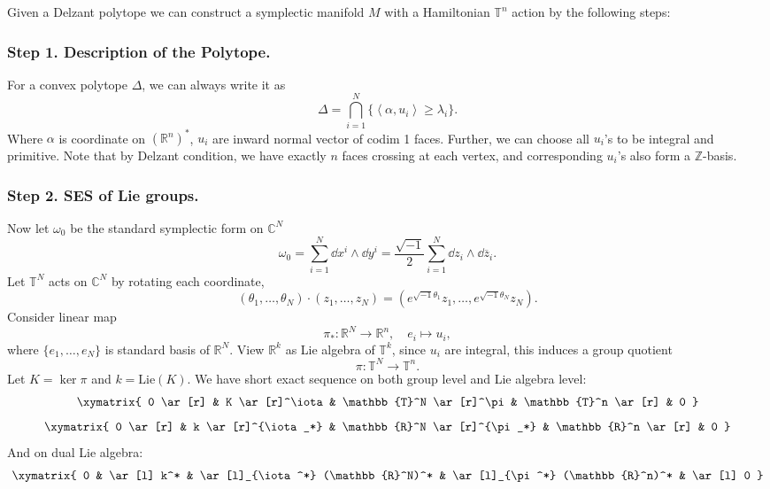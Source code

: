 \documentclass[12pt]{article}
\theoremstyle{plain}\newtheorem{theorem}{Theorem}
\theoremstyle{definition}\newtheorem{definition}[theorem]{Definition}
\theoremstyle{definition}\newtheorem{example}[theorem]{Example}
\theoremstyle{plain}\newtheorem{axiom}[theorem]{Axiom}
\theoremstyle{plain}\newtheorem{assertion}[theorem]{Assertion}
\theoremstyle{plain}\newtheorem{corollary}[theorem]{Corollary}
\theoremstyle{plain}\newtheorem{lemma}[theorem]{Lemma}
\theoremstyle{plain}\newtheorem{proposition}[theorem]{Proposition}
\theoremstyle{plain}\newtheorem{prop}[theorem]{Proposition}
\theoremstyle{plain}\newtheorem{conjecture}[theorem]{Conjecture}
\theoremstyle{plain}\newtheorem{conj}[theorem]{Conjecture}
\theoremstyle{plain}\newtheorem{problem}[theorem]{Problem}
\theoremstyle{remark}\newtheorem{notation}[theorem]{Notation}
\theoremstyle{definition}\newtheorem*{question}{Question}
\theoremstyle{definition}\newtheorem*{answer}{Answer}
\theoremstyle{definition}\newtheorem*{goal}{Goal}
\theoremstyle{plain}\newtheorem*{application}{Application}
\theoremstyle{plain}\newtheorem*{exercise}{Exercise}
\theoremstyle{remark}\newtheorem*{remark}{Remark}
\theoremstyle{remark}\newtheorem*{note}{\small{Note}}
\numberwithin{equation}{section}
\numberwithin{theorem}{section}
\numberwithin{figure}{section}
\begin{document}
Given a Delzant polytope we can construct a symplectic manifold \(M\) with a
Hamiltonian \(\mathbb{T}^n\) action by the following steps:

\subsubsection*{Step 1. Description of the Polytope.}
For a convex polytope \(\Delta\), we can always write it as \[
    \Delta=\bigcap_{i=1}^N \{\left<\alpha,u_i\right> \ge \lambda_i\}
.\] Where \(\alpha\) is coordinate on \((\mathbb{R}^n)^*\), \(u_i\) are inward
normal vector of codim 1 faces. Further, we can choose all \(u_i\)'s to be integral and
primitive. Note that by Delzant condition, we have exactly \(n\) faces crossing
at each vertex, and corresponding \(u_i\)'s also form a \(\mathbb{Z}\)-basis.

\subsubsection*{Step 2. SES of Lie groups.}
Now let \(\omega_0\) be the standard symplectic form on \(\mathbb{C}^N\) \[
    \omega_0=\sum_{i=1}^N \dd{x^i}\wedge \dd{y^i}=\frac{\sqrt{-1}}{2}
    \sum_{i=1}^N\dd{z_i}\wedge \dd{\overline{z}_i}
.\] Let \(\mathbb{T}^N\) acts on \(\mathbb{C}^N\) by rotating each coordinate, \ie\ \[
    (\theta_1,\ldots,\theta_N)\cdot (z_1,\ldots,z_N)
    =(e^{\sqrt{-1}\theta_1}z_1,\ldots,e^{\sqrt{-1}\theta_N}z_N)
.\] Consider linear map \[
    \pi_*\colon \mathbb{R}^N \longrightarrow \mathbb{R}^n,\quad
    e_i \longmapsto u_i
,\] where \(\{e_1,\ldots,e_N\}\) is standard basis of \(\mathbb{R}^N\).
View \(\mathbb{R}^k\) as Lie algebra of \(\mathbb{T}^k\), since \(u_i\) are integral,
this induces a group quotient \[
    \pi\colon \mathbb{T}^N\longrightarrow \mathbb{T}^n
.\] Let \(K=\ker \pi\) and \(k=\mathrm{Lie}(K)\). We have short exact
sequence on both group level and Lie algebra level: \[
\xymatrix{
    0 \ar[r] & K \ar[r]^\iota & \mathbb{T}^N \ar[r]^\pi & \mathbb{T}^n \ar[r] & 0
}\] \[
\xymatrix{
    0 \ar[r] & k \ar[r]^{\iota_*} & \mathbb{R}^N \ar[r]^{\pi_*}
    & \mathbb{R}^n \ar[r] & 0
}\] And on dual Lie algebra: \[
\xymatrix{
    0 & \ar[l] k^* & \ar[l]_{\iota^*} (\mathbb{R}^N)^* & \ar[l]_{\pi^*}
    (\mathbb{R}^n)^* & \ar[l] 0
}\] 
\end{document}
